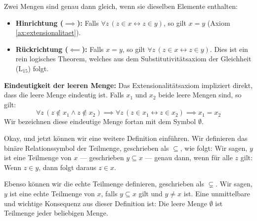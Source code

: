 \begin{math-stroke}
Zwei Mengen sind genau dann gleich, wenn sie dieselben Elemente enthalten:
\begin{itemize}
    \item \textbf{Hinrichtung ($\implies$):} Falls $\forall z \, (z \in x \leftrightarrow z \in y)$, so gilt $x = y$ (Axiom \ref{ax:extensionalitaet}).
    \item \textbf{Rückrichtung ($\impliedby$):} Falls $x = y$, so gilt $\forall z \, (z \in x \leftrightarrow z \in y)$. Dies ist ein rein logisches Theorem, welches aus dem Substitutivitätsaxiom der Gleichheit ($\text{L}_{15}$) folgt.
\end{itemize}

\textbf{Eindeutigkeit der leeren Menge:}
Das Extensionalitätsaxiom impliziert direkt, dass die leere Menge eindeutig ist. Falls $x_1$ und $x_2$ beide leere Mengen sind, so gilt:
\[ \forall z \, (z \notin x_1 \land z \notin x_2) \implies \forall z \, (z \in x_1 \leftrightarrow z \in x_2) \implies x_1 = x_2 \]
Wir bezeichnen diese eindeutige Menge fortan mit dem Symbol $\emptyset$.
\end{math-stroke}

\begin{spoken-clean}[01:24:10 - 01:26:22]
Okay, und jetzt können wir eine weitere Definition einführen. Wir definieren das binäre Relationssymbol der Teilmenge, geschrieben als $\subseteq$, wie folgt: Wir sagen, $y$ ist eine Teilmenge von $x$ --- geschrieben $y \subseteq x$ --- genau dann, wenn für alle $z$ gilt: Wenn $z \in y$, dann folgt daraus $z \in x$.

Ebenso können wir die echte Teilmenge definieren, geschrieben als $\subsetneq$. Wir sagen, $y$ ist eine echte Teilmenge von $x$, falls $y \subseteq x$ gilt und $y \neq x$ ist. Eine unmittelbare und wichtige Konsequenz aus dieser Definition ist: Die leere Menge $\emptyset$ ist Teilmenge jeder beliebigen Menge.
\end{spoken-clean}

